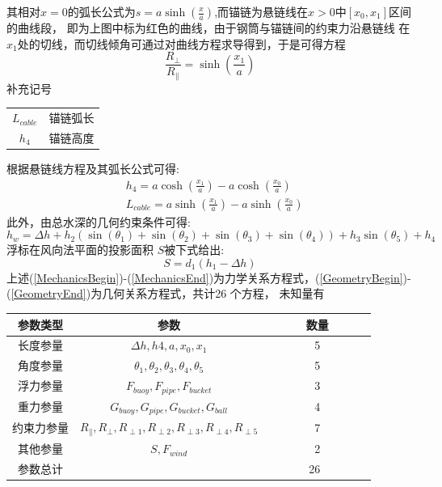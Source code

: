 \documentclass[a4paper,12pt]{ctexart}
\begin{document}
其相对$x=0$的弧长公式为$s=a\sinh(\frac{x}{a})$,而锚链为悬链线在$x>0$中$[x_0,x_1]$区间的曲线段，
即为上图中标为红色的曲线，由于钢筒与锚链间的约束力沿悬链线
在$x_1$处的切线，而切线倾角可通过对曲线方程求导得到，于是可得方程
\begin{equation}
\frac{R_{\perp}}{R_{\parallel}}=\sinh(\frac{x_1}{a})
\end{equation}
补充记号
\begin{tabular}{cc}
$L_{cable}$ & 锚链弧长  \\
$h_4$ & 锚链高度 \\
\end{tabular}
根据悬链线方程及其弧长公式可得:
\begin{align}
&h_4=a\cosh(\frac{x_1}{a})-a\cosh(\frac{x_0}{a})\\
&L_{cable}=a\sinh(\frac{x_1}{a})-a\sinh(\frac{x_0}{a})
\end{align}
此外，由总水深的几何约束条件可得:
\begin{equation}
h_w=\Delta h+h_2(\sin(\theta_1)+\sin(\theta_2)+\sin(\theta_3)+\sin(\theta_4))+h_3\sin(\theta_5)+h_4
\end{equation}
浮标在风向法平面的投影面积 \( S \)被下式给出:
\begin{equation}
S=d_1(h_1-\Delta h)  \label{GeometryEnd}
\end{equation}
上述(\ref{MechanicsBegin})-(\ref{MechanicsEnd})为力学关系方程式，(\ref{GeometryBegin})-(\ref{GeometryEnd})为几何关系方程式，共计26 个方程，
未知量有\\
\begin{center}
\begin{tabular}{ccc}
  \hline \hline
参数类型 & 参数 & 数量\\ \hline
长度参量 & $\Delta h,h4,a,x_0,x_1$ &5\\
角度参量 & $\theta_1,\theta_2,\theta_3,\theta_4,\theta_5$ &5\\
浮力参量 & $F_{buoy},F_{pipe},F_{bucket}$ &3\\
重力参量 & $G_{buoy},G_{pipe},G_{bucket},G_{ball}$ &4\\
约束力参量 & $R_{\parallel},R_{\perp},R_{\perp1},R_{\perp2},R_{\perp3},R_{\perp4},R_{\perp5} $ & 7\\
其他参量 & $S,F_{wind}$&2\\
参数总计&&~~~~~~~26~~~~~~~~\\ \hline \hline
\end{tabular}
\end{center}
\end{document}
